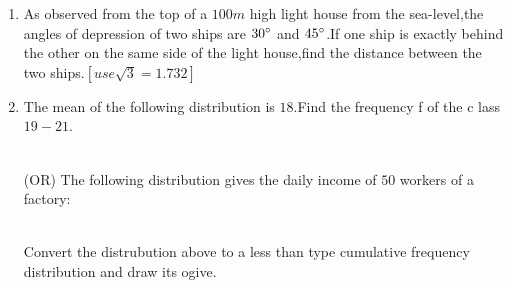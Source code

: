 \documentclass{article}
\begin{document}
\begin{enumerate}
        \item As observed from the top of a $100m$ high light house from the sea-level,the angles of depression of two ships are $30\degree$ and $45\degree$.If one ship is exactly behind the other on the same side of the light house,find the distance between the two ships.$[use \sqrt3=1.732]$
		\item The mean of the following distribution is $18$.Find the frequency f of the c
lass $19-21$.\\
                \begin{table}[htb]                                                                                \centering
                \end{table}\\
		(OR)
	The following distribution gives the daily income of $50$ workers of a factory:\\
\begin{table}[htb]
	\centering
	\end{table}\\
	Convert the distrubution above to a less than type cumulative frequency distribution and draw its ogive.
	\end{enumerate}
	
\end{document}

